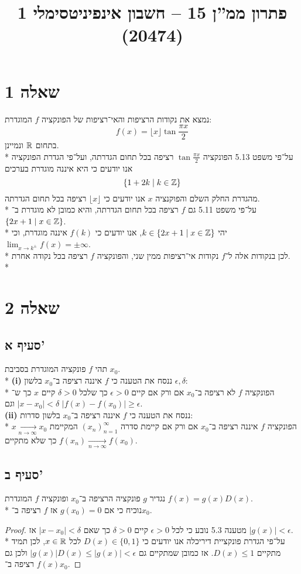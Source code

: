 
\title{פתרון ממ''ן 15 – חשבון אינפיניטסימלי 1 (20474)}


\maketitle
\section{שאלה 1}
נמצא את נקודות הרציפות והאי־רציפות של הפונקציה $f$ המוגדרת:
\[
	f(x) = \lfloor x \rfloor \tan \frac{\pi x}{2}
\]
בתחום $\mathbb{R}$ ונמיינן. \\*
על־פי משפט 5.13 הפונקציה $\tan \frac{\pi x}{2}$ רציפה בכל תחום הגדרתה, ועל־פי הגדרת הפונקציה אנו יודעים כי היא איננה מוגדרת בערכים
\[
	\left\{ 1 + 2k \mid k \in \mathbb{Z} \right\}
\]
מהגדרת החלק השלם והפוקנציה $x$ אנו יודעים כי $\lfloor x \rfloor$ רציפה בכל תחום הגדרתה. \\*
על־פי משפט 5.11 גם $f$ רציפה בכל תחום הגדרתה, והיא כמובן לא מוגדרת ב־$\{ 2x + 1 \mid x \in \mathbb{Z}\}$. \\*
יהי $k \in \{ 2x + 1 \mid x \in \mathbb{Z} \}$, אנו יודעים כי $f(k)$ איננה מוגדרת, וכי $\lim_{x \to k^\pm} f(x) = \pm \infty$. \\*
לכן בנקודות אלה ל־$f$ נקודות אי־רציפות ממין שני, והפונקציה $f$ רציפה בכל נקודה אחרת. \\*

\section{שאלה 2}
\subsection{סעיף א'}
תהי $f$ פונקציה המוגדרת בסביבת $x_0$. \\*
\textbf{(i)}
ננסח את הטענה כי $f$ איננה רציפה ב־$x_0$ בלשון $\epsilon, \delta$: \\*
הפונקציה $f$ לא רציפה ב־$x_0$ אם ורק אם קיים $\epsilon > 0$ כך שלכל $\delta > 0$ קיים $x$ כך ש־$|x - x_0| < \delta$ וגם $|f(x) - f(x_0)| \ge \epsilon$. \\
\textbf{(ii)}
ננסח את הטענה כי $f$ איננה רציפה ב־$x_0$ בלשון סדרות: \\*
הפונקציה $f$ איננה רציפה ב־$x_0$ אם ורק אם קיימת סדרה ${(x_n)}_{n = 1}^\infty$ המקיימת $x \underset{n \to \infty}{\rightarrow} x_0$
כך שלא מתקיים $f(x_n) \underset{n \to \infty}{\rightarrow} f(x_0)$.

\subsection{סעיף ב'}
נגדיר $g$ פונקציה הרציפה ב־$x_0$ ופונקציה $f$ המוגדרת $f(x) = g(x) D(x)$. \\*
נוכיח כי אם $g(x_0) = 0$ אז $f$ רציפה ב־$x_0$.
\begin{proof}
	מטענה 5.3 נובע כי לכל $\epsilon > 0$ קיים $\delta > 0$ כך שאם $|x - x_0| < \delta$ אז $|g(x)| < \epsilon$. \\*
	על־פי הגדרת פונקציית דיריכלה אנו יודעים כי $D(x) \in \{0, 1\}$ לכל $x \in \mathbb{R}$,
	לכן תמיד מתקיים $D(x) \le 1$. אז כמובן שמתקיים גם $|g(x)| D(x) \le |g(x)| < \epsilon$ ולכן גם $f(x)$ רציפה ב־$x_0$.
\end{proof}

